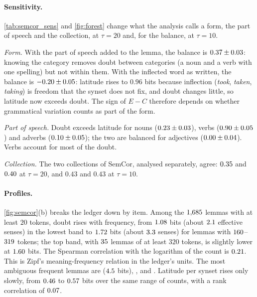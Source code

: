 \paragraph{Sensitivity.} \cref{tab:semcor_sens} and \cref{fig:forest} change what the analysis calls a form, the part of speech and the collection, at $\tau=20$ and, for the balance, at $\tau=10$.

\emph{Form.} With the part of speech added to the lemma, the balance is $0.37\pm0.03$: knowing the category removes doubt between categories (a noun and a verb with one spelling) but not within them. With the inflected word as written, the balance is $-0.20\pm0.05$: latitude rises to $0.96$ bits because inflection (\emph{took}, \emph{taken}, \emph{taking}) is freedom that the synset does not fix, and doubt changes little, so latitude now exceeds doubt. The sign of $E-C$ therefore depends on whether grammatical variation counts as part of the form.

\emph{Part of speech.} Doubt exceeds latitude for nouns ($0.23\pm0.03$), verbs ($0.90\pm0.05$) and adverbs ($0.10\pm0.05$); the two are balanced for adjectives ($0.00\pm0.04$). Verbs account for most of the doubt.

\emph{Collection.} The two collections of SemCor, analysed separately, agree: $0.35$ and $0.40$ at $\tau=20$, and $0.43$ and $0.43$ at $\tau=10$.
\begin{table}[tbp]
\caption{Sensitivity of the SemCor ledger to the definition of the form, the part of speech and the collection. Bits; Miller--Madow estimates with $95\,\%$ intervals from $\SemB$ document resamplings. ``Kept'' is the fraction of the tokens of the analysis that survive the core restriction.}\label{tab:semcor_sens}
\centering\small

\end{table}


\paragraph{Profiles.} \cref{fig:semcor}(b) breaks the ledger down by item. Among the $1{,}685$ lemmas with at least $20$ tokens, doubt rises with frequency, from $1.08$ bits (about $2.1$ effective senses) in the lowest band to $1.72$ bits (about $3.3$ senses) for lemmas with $160$--$319$ tokens; the top band, with $35$ lemmas of at least $320$ tokens, is slightly lower at $1.60$ bits. The Spearman correlation with the logarithm of the count is $0.21$. This is Zipf's meaning-frequency relation \citep{zipf1945} in the ledger's units. The most ambiguous frequent lemmas are \emph{\SemTopA} ($4.5$ bits), \emph{\SemTopB}, \emph{\SemTopC} and \emph{\SemTopD}. Latitude per synset rises only slowly, from $0.46$ to $0.57$ bits over the same range of counts, with a rank correlation of $0.07$.


